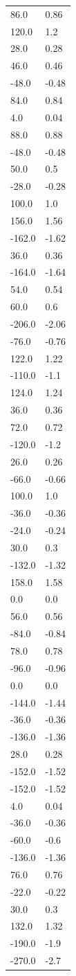 \begin{longtable}{ll}
86.0 & 0.86 \\
120.0 & 1.2 \\
28.0 & 0.28 \\
46.0 & 0.46 \\
-48.0 & -0.48 \\
84.0 & 0.84 \\
4.0 & 0.04 \\
88.0 & 0.88 \\
-48.0 & -0.48 \\
50.0 & 0.5 \\
-28.0 & -0.28 \\
100.0 & 1.0 \\
156.0 & 1.56 \\
-162.0 & -1.62 \\
36.0 & 0.36 \\
-164.0 & -1.64 \\
54.0 & 0.54 \\
60.0 & 0.6 \\
-206.0 & -2.06 \\
-76.0 & -0.76 \\
122.0 & 1.22 \\
-110.0 & -1.1 \\
124.0 & 1.24 \\
36.0 & 0.36 \\
72.0 & 0.72 \\
-120.0 & -1.2 \\
26.0 & 0.26 \\
-66.0 & -0.66 \\
100.0 & 1.0 \\
-36.0 & -0.36 \\
-24.0 & -0.24 \\
30.0 & 0.3 \\
-132.0 & -1.32 \\
158.0 & 1.58 \\
0.0 & 0.0 \\
56.0 & 0.56 \\
-84.0 & -0.84 \\
78.0 & 0.78 \\
-96.0 & -0.96 \\
0.0 & 0.0 \\
-144.0 & -1.44 \\
-36.0 & -0.36 \\
-136.0 & -1.36 \\
28.0 & 0.28 \\
-152.0 & -1.52 \\
-152.0 & -1.52 \\
4.0 & 0.04 \\
-36.0 & -0.36 \\
-60.0 & -0.6 \\
-136.0 & -1.36 \\
76.0 & 0.76 \\
-22.0 & -0.22 \\
30.0 & 0.3 \\
132.0 & 1.32 \\
-190.0 & -1.9 \\
-270.0 & -2.7 \\
\bottomrule
\end{longtable}
\endgroup
